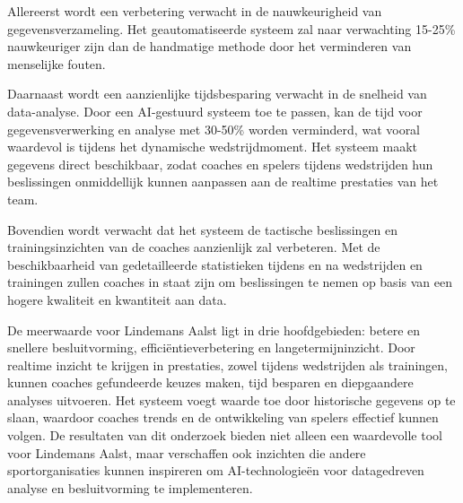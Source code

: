 Allereerst wordt een verbetering verwacht in de nauwkeurigheid van gegevensverzameling. Het geautomatiseerde systeem zal naar verwachting 15-25\% nauwkeuriger zijn dan de handmatige methode door het verminderen van menselijke fouten.

Daarnaast wordt een aanzienlijke tijdsbesparing verwacht in de snelheid van data-analyse. Door een AI-gestuurd systeem toe te passen, kan de tijd voor gegevensverwerking en analyse met 30-50\% worden verminderd, wat vooral waardevol is tijdens het dynamische wedstrijdmoment. Het systeem maakt gegevens direct beschikbaar, zodat coaches en spelers tijdens wedstrijden hun beslissingen onmiddellijk kunnen aanpassen aan de realtime prestaties van het team.

Bovendien wordt verwacht dat het systeem de tactische beslissingen en trainingsinzichten van de coaches aanzienlijk zal verbeteren. Met de beschikbaarheid van gedetailleerde statistieken tijdens en na wedstrijden en trainingen zullen coaches in staat zijn om beslissingen te nemen op basis van een hogere kwaliteit en kwantiteit aan data.

De meerwaarde voor Lindemans Aalst ligt in drie hoofdgebieden: betere en snellere besluitvorming, efficiëntieverbetering en langetermijninzicht. Door realtime inzicht te krijgen in prestaties, zowel tijdens wedstrijden als trainingen, kunnen coaches gefundeerde keuzes maken, tijd besparen en diepgaandere analyses uitvoeren. Het systeem voegt waarde toe door historische gegevens op te slaan, waardoor coaches trends en de ontwikkeling van spelers effectief kunnen volgen. De resultaten van dit onderzoek bieden niet alleen een waardevolle tool voor Lindemans Aalst, maar verschaffen ook inzichten die andere sportorganisaties kunnen inspireren om AI-technologieën voor datagedreven analyse en besluitvorming te implementeren.
